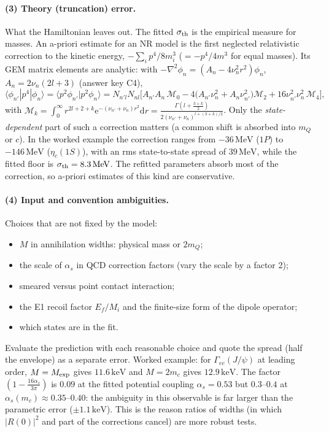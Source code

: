 \documentclass[11pt,a4paper]{article}
\numberwithin{equation}{section}
\theoremstyle{definition}
\theoremstyle{plain}
\theoremstyle{remark}
\numberwithin{algorithm}{section}
\newcommand{\as}{\alpha_s}
\newcommand{\dd}{\mathrm{d}}
\newcommand{\ee}{\mathrm{e}}
\newcommand{\MeV}{\,\mathrm{MeV}}
\newcommand{\keV}{\,\mathrm{keV}}
\begin{document}
\paragraph{(3) Theory (truncation) error.} What the Hamiltonian leaves out. The fitted $\sigma_{\rm th}$ is the empirical measure for masses. An a-priori estimate for an NR model is the first neglected relativistic correction to the kinetic energy, $-\sum_i p^4/8m_i^3$ ($=-p^4/4m^3$ for equal masses). Its GEM matrix elements are analytic: with $-\nabla^2\phi_n=(A_n-4\nu_n^2r^2)\phi_n$, $A_n=2\nu_n(2l+3)$ (answer key C4),
\begin{equation}
\langle\phi_{n'}|p^4|\phi_n\rangle=\langle p^2\phi_{n'}|p^2\phi_n\rangle
=N_{n'l}N_{nl}\Big[A_{n'}A_n\,\mathcal M_0-4\big(A_{n'}\nu_n^2+A_n\nu_{n'}^2\big)\mathcal M_2+16\nu_{n'}^2\nu_n^2\,\mathcal M_4\Big],
\end{equation}
with $\mathcal M_k=\int_0^\infty r^{2l+2+k}\ee^{-(\nu_{n'}+\nu_n)r^2}\dd r=\frac{\Gamma(l+\frac{3+k}{2})}{2(\nu_{n'}+\nu_n)^{l+(3+k)/2}}$. Only the \emph{state-dependent} part of such a correction matters (a common shift is absorbed into $m_Q$ or $c$). In the worked example the correction ranges from $-36\MeV$ ($1P$) to $-146\MeV$ ($\eta_c(1S)$), with an rms state-to-state spread of $39\MeV$, while the fitted floor is $\sigma_{\rm th}=8.3\MeV$. The refitted parameters absorb most of the correction, so a-priori estimates of this kind are conservative.

\paragraph{(4) Input and convention ambiguities.} Choices that are not fixed by the model:
\begin{itemize}[leftmargin=1.3em,itemsep=2pt]
\item $M$ in annihilation widths: physical mass or $2m_Q$;
\item the scale of $\as$ in QCD correction factors (vary the scale by a factor 2);
\item smeared versus point contact interaction;
\item the E1 recoil factor $E_f/M_i$ and the finite-size form of the dipole operator;
\item which states are in the fit.
\end{itemize}
Evaluate the prediction with each reasonable choice and quote the spread (half the envelope) as a separate error. Worked example: for $\Gamma_{ee}(J/\psi)$ at leading order, $M=M_{\rm exp}$ gives $11.6\keV$ and $M=2m_c$ gives $12.9\keV$. The factor $(1-\frac{16\as}{3\pi})$ is $0.09$ at the fitted potential coupling $\as=0.53$ but $0.3$--$0.4$ at $\as(m_c)\approx0.35$--$0.40$: the ambiguity in this observable is far larger than the parametric error ($\pm1.1\keV$). This is the reason ratios of widths (in which $|R(0)|^2$ and part of the corrections cancel) are more robust tests.
\end{document}
